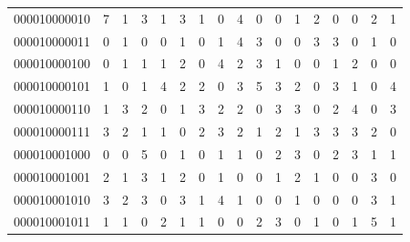\documentclass[10pt,a4paper]{article}
\begin{document}
\begin{longtable}{ |c|c|c|c|c|c|c|c|c|c|c|c|c|c|c|c|c| }
    000010000010              & 7                            & 1                                & 3                            & 1                              & 3   & 1   & 0   & 4   & 0   & 0   & 1   & 2   & 0   & 0   & 2   & 1   \\
    000010000011              & 0                            & 1                                & 0                            & 0                              & 1   & 0   & 1   & 4   & 3   & 0   & 0   & 3   & 3   & 0   & 1   & 0   \\
    000010000100              & 0                            & 1                                & 1                            & 1                              & 2   & 0   & 4   & 2   & 3   & 1   & 0   & 0   & 1   & 2   & 0   & 0   \\
    000010000101              & 1                            & 0                                & 1                            & 4                              & 2   & 2   & 0   & 3   & 5   & 3   & 2   & 0   & 3   & 1   & 0   & 4   \\
    000010000110              & 1                            & 3                                & 2                            & 0                              & 1   & 3   & 2   & 2   & 0   & 3   & 3   & 0   & 2   & 4   & 0   & 3   \\
    000010000111              & 3                            & 2                                & 1                            & 1                              & 0   & 2   & 3   & 2   & 1   & 2   & 1   & 3   & 3   & 3   & 2   & 0   \\
    000010001000              & 0                            & 0                                & 5                            & 0                              & 1   & 0   & 1   & 1   & 0   & 2   & 3   & 0   & 2   & 3   & 1   & 1   \\
    000010001001              & 2                            & 1                                & 3                            & 1                              & 2   & 0   & 1   & 0   & 0   & 1   & 2   & 1   & 0   & 0   & 3   & 0   \\
    000010001010              & 3                            & 2                                & 3                            & 0                              & 3   & 1   & 4   & 1   & 0   & 0   & 1   & 0   & 0   & 0   & 3   & 1   \\
    000010001011              & 1                            & 1                                & 0                            & 2                              & 1   & 1   & 0   & 0   & 2   & 3   & 0   & 1   & 0   & 1   & 5   & 1   \\

\end{longtable}
\end{document}
